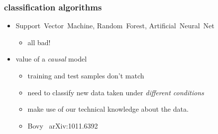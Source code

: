 \documentclass[pdftex]{beamer}
\begin{document}
\begin{frame}
  \frametitle{classification algorithms}
  \begin{itemize}
  \item Support~Vector~Machine, Random~Forest, Artificial~Neural~Net
    \begin{itemize}
    \item all bad!
    \end{itemize}
  \item value of a \emph{causal} model
    \begin{itemize}
    \item training and test samples don't match
    \item need to classify new data taken under \emph{different conditions}
    \item make use of our technical knowledge about the data.
    \item Bovy \etal\ arXiv:1011.6392
    \end{itemize}
  \end{itemize}
\end{frame}

\end{document}

